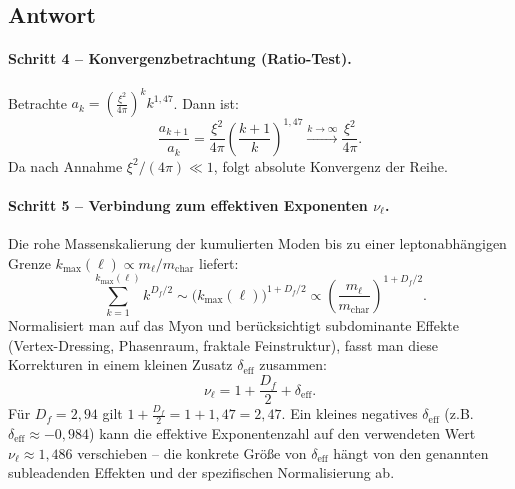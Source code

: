 \documentclass[12pt,a4paper]{article}
\theoremstyle{remark}
\newenvironment{answer}{\subsection*{Antwort}}{\vspace{1em}}
\begin{document}
\begin{answer}
\paragraph{Schritt 4 -- Konvergenzbetrachtung (Ratio-Test).}
Betrachte $a_k = \left( \frac{\xi^2}{4\pi} \right)^k k^{1{,}47}$. Dann ist:
\begin{equation}
	\frac{a_{k+1}}{a_k} = \frac{\xi^2}{4\pi} \left( \frac{k+1}{k} \right)^{1{,}47} \xrightarrow{k \to \infty} \frac{\xi^2}{4\pi}.
\end{equation}
Da nach Annahme $\xi^2 / (4\pi) \ll 1$, folgt absolute Konvergenz der Reihe.

\paragraph{Schritt 5 -- Verbindung zum effektiven Exponenten $\nu_\ell$.}
Die rohe Massenskalierung der kumulierten Moden bis zu einer leptonabhängigen Grenze $k_{\max}(\ell) \propto m_\ell / m_{\text{char}}$ liefert:
\begin{equation}
	\sum_{k=1}^{k_{\max}(\ell)} k^{D_f / 2} \sim \big( k_{\max}(\ell) \big)^{1 + D_f / 2} \propto \left( \frac{m_\ell}{m_{\text{char}}} \right)^{1 + D_f / 2}.
\end{equation}
Normalisiert man auf das Myon und berücksichtigt subdominante Effekte (Vertex-Dressing, Phasenraum, fraktale Feinstruktur), fasst man diese Korrekturen in einem kleinen Zusatz $\delta_{\text{eff}}$ zusammen:
\begin{equation}
	\nu_\ell = 1 + \frac{D_f}{2} + \delta_{\text{eff}}.
\end{equation}
Für $D_f = 2{,}94$ gilt $1 + \frac{D_f}{2} = 1 + 1{,}47 = 2{,}47$. Ein kleines negatives $\delta_{\text{eff}}$ (z.B. $\delta_{\text{eff}} \approx -0{,}984$) kann die effektive Exponentenzahl auf den verwendeten Wert $\nu_\ell \approx 1{,}486$ verschieben -- die konkrete Größe von $\delta_{\text{eff}}$ hängt von den genannten subleadenden Effekten und der spezifischen Normalisierung ab.


\end{answer}
\end{document}
